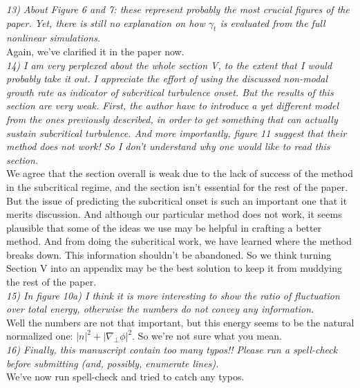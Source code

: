 \documentclass[12pt]{article}
\def\grad{\nabla}
\newcommand{\gradperp}{\grad_\perp}
\begin{document}
\emph{13) About Figure 6 and 7: these represent probably the most crucial figures of the paper. Yet, there is still no explanation on how $\gamma_t$ is evaluated from the full nonlinear simulations. }\\

Again, we've clarified it in the paper now.\\

\emph{14) I am very perplexed about the whole section V, to the extent that I would probably take it out. I appreciate the effort of using the discussed non-modal growth rate as indicator of subcritical turbulence onset. But the results of this section are very weak. First, the author have to introduce a yet different model from the ones previously described, in order to get something that can actually sustain subcritical turbulence. And more importantly, figure 11 suggest that their method does not work! So I don't understand why one would like to read this section. }\\

We agree that the section overall is weak due to the lack of success of the method in the subcritical regime, and the section isn't essential for the rest of the paper. But the issue
of predicting the subcritical onset is such an important one that it merits discussion. And although our particular method does not work, it seems plausible that some of the ideas
we use may be helpful in crafting a better method. And from doing the subcritical work, we have learned where the method breaks down. This information shouldn't be abandoned.
So we think turning Section V into an appendix may be the best solution to keep it from muddying the rest of the paper.\\

\emph{15) In figure 10a) I think it is more interesting to show the ratio of fluctuation over total energy, otherwise the numbers do not convey any information. }\\

Well the numbers are not that important, but this energy seems to be the natural normalized one: $|n|^2 + |\gradperp \phi|^2$. So we're not sure what you mean. \\

\emph{16) Finally, this manuscript contain too many typos!! Please run a spell-check before submitting (and, possibly, enumerate lines). }\\

We've now run spell-check and tried to catch any typos.





%
%
\end{document}

